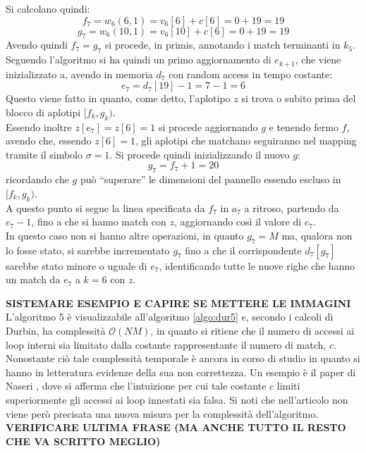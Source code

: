 \begin{esempio}
  Si calcolano quindi:
  \[f_7=w_6(6,1)=v_6[6]+c[6]=0+19=19\]
  \[g_7=w_6(10,1)=v_6[10]+c[6]=0+19=19\]
  Avendo quindi $f_7=g_7$ si procede, in primis, annotando i match terminanti in
  $k_5$.\\
  Seguendo l'algoritmo si ha quindi un primo aggiornamento di $e_{k+1}$, che
  viene inizializzato a, avendo in memoria $d_7$ con random access in tempo
  costante: 
  \[e_7=d_7[19]-1=7-1=6\]
  Questo viene fatto in quanto, come detto, l'aplotipo $z$ si trova o subito
  prima del blocco di aplotipi $[f_k,g_k)$.\\
  Essendo inoltre $z[e_7]=z[6]=1$ si procede aggiornando $g$ e tenendo fermo
  $f$, avendo che, essendo $z[6]=1$, gli aplotipi che matchano seguiranno nel
  mapping tramite il simbolo $\sigma=1$. Si procede quindi inizializzando il
  nuovo $g$:
  \[g_7=f_7+1=20\]
  ricordando che $g$ può ``superare'' le dimensioni del pannello essendo
  escluso in $[f_k,g_k)$.\\
  A questo punto si segue la linea specificata da $f_7$ in $a_7$ a ritroso,
  partendo da $e_7-1$, fino a che si hanno match con $z$, aggiornando così il
  valore di $e_7$.\\
  In questo caso non si hanno altre operazioni, in quanto $g_7=M$ ma, qualora
  non lo fosse stato, si sarebbe incrementato $g_7$ fino a che il corrispondente
  $d_7[g_7]$ sarebbe stato minore o uguale di $e_7$, identificando tutte le
  nuove righe che hanno un match da $e_7$ a $k=6$ con $z$.
\end{esempio}
\textbf{SISTEMARE ESEMPIO E CAPIRE SE METTERE LE IMMAGINI}\\
L'algoritmo 5 è visualizzabile all'algoritmo \ref{algo:dur5} e, secondo i
calcoli di Durbin, ha complessità $\mathcal{O}(NM)$, in quanto si ritiene che il
numero di accessi ai loop interni sia limitato dalla costante rappresentante il
numero di match, $c$. Nonostante ciò tale complessità temporale è ancora in
corso di studio in quanto si hanno in letteratura evidenze della sua non
correttezza. Un esempio è il paper di Naseri \cite{dpbwt}, dove si afferma che
l'intuizione per cui tale costante $c$ limiti superiormente gli accessi ai loop
innestati sia falsa. Si noti che nell'articolo non viene però precisata una
nuova misura per la complessità dell'algoritmo.
\textbf{VERIFICARE ULTIMA FRASE (MA ANCHE TUTTO IL RESTO CHE VA SCRITTO MEGLIO)}
